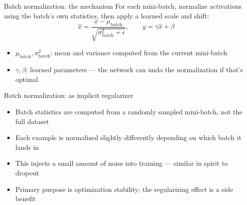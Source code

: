 \documentclass[aspectratio=169, 10pt]{beamer}
\begin{document}
\begin{frame}{Batch normalization: the mechanism}
  For each mini-batch, normalize activations using the batch's own statistics, then apply a learned scale and shift:
  \[
    \hat{x} = \frac{x - \mu_{\text{batch}}}{\sqrt{\sigma^2_{\text{batch}} + \epsilon}}, \qquad y = \gamma \hat{x} + \beta
  \]
  \begin{itemize}
    \item $\mu_{\text{batch}}, \sigma^2_{\text{batch}}$: mean and variance computed from the current mini-batch
    \item $\gamma, \beta$: learned parameters --- the network can undo the normalization if that's optimal
  \end{itemize}
\end{frame}

\begin{frame}{Batch normalization: as implicit regularizer}
  \begin{itemize}
    \item Batch statistics are computed from a randomly sampled mini-batch, not the full dataset
    \item Each example is normalized slightly differently depending on which batch it lands in
    \item This injects a small amount of noise into training --- similar in spirit to dropout
    \item Primary purpose is optimization stability; the regularizing effect is a side benefit
  \end{itemize}
\end{frame}
\end{document}
